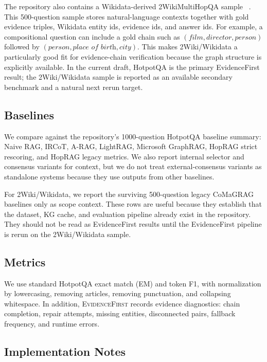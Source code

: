 \documentclass[runningheads]{llncs}
\newcommand{\sys}{\textsc{EvidenceFirst}\xspace}
\begin{document}
The repository also contains a Wikidata-derived 2WikiMultiHopQA sample
~\cite{ho2020constructing}. This 500-question sample stores natural-language
contexts together with gold evidence triples, Wikidata entity ids, evidence
ids, and answer ids. For example, a compositional question can include a gold
chain such as $(\textit{film}, \textit{director}, \textit{person})$ followed by
$(\textit{person}, \textit{place of birth}, \textit{city})$. This makes
2Wiki/Wikidata a particularly good fit for evidence-chain verification because
the graph structure is explicitly available. In the current draft, HotpotQA is
the primary EvidenceFirst result; the 2Wiki/Wikidata sample is reported as an
available secondary benchmark and a natural next rerun target.

\subsection{Baselines}

We compare against the repository's 1000-question HotpotQA baseline summary:
Naive RAG, IRCoT, A-RAG, LightRAG, Microsoft GraphRAG, HopRAG strict rescoring,
and HopRAG legacy metrics. We also report internal selector and consensus
variants for context, but we do not treat external-consensus variants as
standalone systems because they use outputs from other baselines.

For 2Wiki/Wikidata, we report the surviving 500-question legacy CoMaGRAG
baselines only as scope context. These rows are useful because they establish
that the dataset, KG cache, and evaluation pipeline already exist in the
repository. They should not be read as EvidenceFirst results until the
EvidenceFirst pipeline is rerun on the 2Wiki/Wikidata sample.

\subsection{Metrics}

We use standard HotpotQA exact match (EM) and token F1, with normalization by
lowercasing, removing articles, removing punctuation, and collapsing
whitespace. In addition, \sys records evidence diagnostics: chain completion,
repair attempts, missing entities, disconnected pairs, fallback frequency, and
runtime errors.

\subsection{Implementation Notes}
\end{document}
